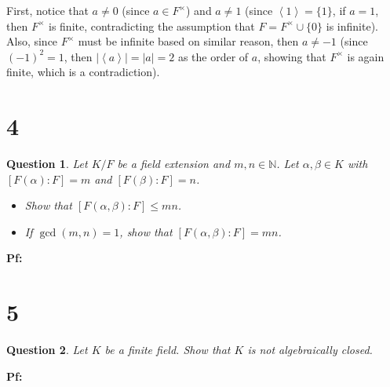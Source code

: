 \documentclass{article}
\newtheorem{question}{Question}
\begin{document}
First, notice that $a\neq 0$ (since $a\in F^\times$) and $a\neq 1$ (since $\left<1\right> = \{1\}$, if $a=1$, then $F^\times$ is finite, contradicting the assumption that $F=F^\times\cup \{0\}$ is infinite). Also, since $F^\times$ must be infinite based on similar reason, then $a\neq -1$ (since $(-1)^2=1$, then $|\left<a\right>| = |a|=2$ as the order of $a$, showing that $F^\times$ is again finite, which is a contradiction).

\break

\section*{4}
\begin{myBox}[]{}
    \begin{question}
        Let $K/F$ be a field extension and $m,n\in\mathbb{N}$. Let $\alpha,\beta\in K$ with $[F(\alpha):F]=m$ and $[F(\beta):F]=n$.
        \begin{itemize}
            \item[(a)] Show that $[F(\alpha,\beta):F]\leq mn$.
            \item[(b)] If $\gcd(m,n)=1$, show that $[F(\alpha,\beta):F]=mn$.
        \end{itemize}
    \end{question}
\end{myBox}

\textbf{Pf:}

\break

\section*{5}
\begin{myBox}[]{}
    \begin{question}
        Let $K$ be a finite field. Show that $K$ is not algebraically closed.
    \end{question}
\end{myBox}

\textbf{Pf:}
\end{document}
